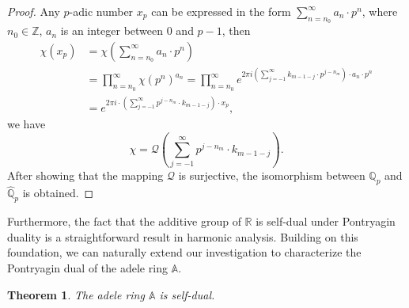 \documentclass[11pt]{article}
\newtheorem{theorem}{Theorem}[section]  %
\newcommand{\A}{\mathbb{A}}
\theoremstyle{remark}
\begin{document}
\begin{proof}
Any $p$-adic number $x_p$ can be expressed in the form  \(\sum\limits_{n=n_0}^{\infty}a_n\cdot p^n\), where $n_0\in \mathbb{Z}$, $a_n$ is an integer between \(0\) and \(p-1\), then
\begin{align}\label{cha}
    \chi(x_p)&=\chi(\sum\limits_{n=n_0}^{\infty}a_n\cdot p^n)\\
    &=\prod\limits_{n=n_0}^{\infty} \chi(p^n)^{a_n}=\prod_{n=n_0}^{\infty}e^{2\pi i\left(\sum\limits_{j=-1}^{\infty}k_{m-1-j}\cdot p^{j-n_m}\right)\cdot a_n\cdot p^n}\\
    &=e^{2\pi i\cdot(\sum_{j=-1}^{\infty}p^{j-n_m}\cdot k_{m-1-j})\cdot x_p},
\end{align}
we have
\begin{equation}
    \chi=\mathcal{Q}\left(\sum_{j=-1}^{\infty}p^{j-n_m}\cdot k_{m-1-j}\right).
\end{equation}
After showing that the mapping \(\mathcal{Q}\) is surjective, the isomorphism between $\mathbb{Q}_p$ and $\hat{\mathbb{Q}}_p$ is obtained.
\end{proof}
Furthermore, the fact that the additive group of $\mathbb{R}$ is self-dual under Pontryagin duality is a straightforward result in harmonic analysis. Building on this foundation, we can naturally extend our investigation to characterize the Pontryagin dual of the adele ring \( \mathbb{A} \). 
\begin{theorem}
        The adele ring $\A$ is self-dual.
\end{theorem}
\end{document}
